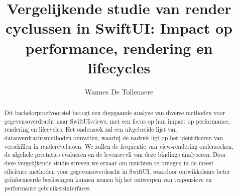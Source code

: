 \documentclass{hogent-article}
\title{Vergelijkende studie van render cyclussen in SwiftUI: Impact op performance, rendering en lifecycles}
\author{Wannes De Tollenaere}
\begin{document}
\begin{abstract}
  Dit bachelorproefvoorstel beoogt een diepgaande analyse van diverse methoden voor gegevensoverdracht naar SwiftUI-views, met een focus op hun impact op performance, rendering en lifecycles. Het onderzoek zal een uitgebreide lijst van dataoverdrachtsmethoden omvatten, waarbij de nadruk ligt op het identificeren van verschillen in rendercyclussen. We zullen de frequentie van view-rendering onderzoeken, de algehele prestaties evalueren en de levenscycli van deze bindings analyseren. Door deze vergelijkende studie streven we ernaar om inzichten te brengen in de meest efficiënte methoden voor gegevensoverdracht in SwiftUI, waardoor ontwikkelaars beter geïnformeerde beslissingen kunnen nemen bij het ontwerpen van responsieve en performante gebruikersinterfaces.
\end{abstract}

\tableofcontents



\printbibliography[heading=bibintoc]
\end{document}
